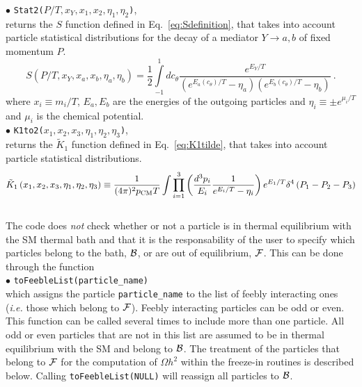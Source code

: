 \documentclass[12pt,a4paper]{article}
\begin{document}
\noindent
$\bullet$ \verb|Stat2(|$P/T,x_Y,x_1,x_2,\eta_1,\eta_2$\verb|)|,\\
 returns the $S$ function defined in Eq.~\eqref{eq:Sdefinition}, that takes into account particle statistical distributions for the decay of a mediator $Y \rightarrow a,b$ of fixed momentum $P$. 
\begin{equation}\label{eq:Sdefinition}
S\left( P/T, x_Y, x_a, x_b, \eta_a, \eta_b \right)= \frac{1}{2}\int\limits_{-1}^{1} dc_{\theta}
\frac{e^{E_Y/T}}{(e^{E_a(c_\theta)/T} - \eta_a)(e^{E_b(c_\theta)/T} - \eta_b)}\ .
\end{equation}
where $x_i \equiv m_i/T$, $E_a,E_b$ are the energies of the outgoing particles and $\eta_i \equiv \pm e^{\mu_i/T}$ and $\mu_i$ is the chemical potential.\\

\noindent$ \bullet$ \verb|K1to2(|$x_1,x_2,x_3,\eta_1,\eta_2,\eta_3$\verb|)|,\\
 returns the $\tilde{K}_1$ function defined in Eq.~\eqref{eq:K1tilde}, that takes into account particle statistical distributions.  
 \begin{equation}\label{eq:K1tilde}
\tilde K_1 \left( x_1, x_2, x_3, \eta_1, \eta_2, \eta_3 \right)  \equiv
\frac{1}{(4\pi)^2 p_{\rm CM} T} \int \prod\limits_{i=1}^{3} \left( \frac{d^3 p_i}{E_i} \frac{1}{e^{E_i/T} - \eta_i} \right) e^{E_1/T} \delta^4 \left( P_1 - P_2 - P_3 \right) 
\end{equation}
\\
The code does \textit{not} check whether or not a particle is in thermal equilibrium with the SM thermal bath and that it is the responsability of the user to specify which particles belong to the bath, ${\cal B}$, or are out of equilibrium, ${\cal F}$. This can be done through the function\\
\noindent
$\bullet$ \verb|toFeebleList(particle_name)|\\
which assigns the particle \verb|particle_name| to the list of feebly interacting ones (\textit{i.e.} those which belong to ${\cal F}$). Feebly interacting particles can be odd or even.   
This function can be called several times to include more than one particle.  All  odd or even particles that are not in this list are assumed to be in thermal equilibrium with the SM and belong to ${\cal B}$. 
The treatment of the particles that belong to  ${\cal F}$ for the computation of $\Omega h^2$ within the freeze-in routines is described below. 
Calling \verb|toFeebleList(NULL)| will reassign all particles to ${\cal B}$. 
\end{document}
